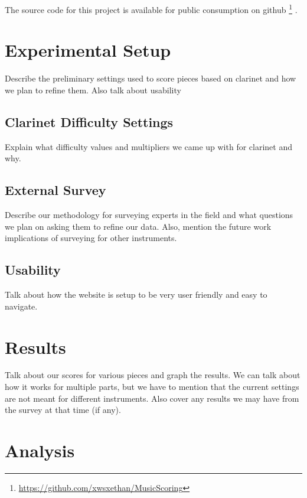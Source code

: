 \documentclass[10pt]{sigplanconf}
\begin{document}
{The source code for this project is available for public consumption on github \footnote{\url{https://github.com/xwsxethan/MusicScoring}} \cite{GithubMusicScoring}.

\section{Experimental Setup} 
\label{sec:experiment}

Describe the preliminary settings used to score pieces based on clarinet and how we plan to refine them. Also talk about usability

\subsection{Clarinet Difficulty Settings} 
\label{sec:settings}

Explain what difficulty values and multipliers we came up with for clarinet and why.

\subsection{External Survey} 
\label{sec:survey}

Describe our methodology for surveying experts in the field and what questions we plan on asking them to refine our data. Also, mention the future work implications of surveying for other instruments.

\subsection{Usability} 
\label{sec:usability}

Talk about how the website is setup to be very user friendly and easy to navigate.

\section{Results} 
\label{sec:results}

Talk about our scores for various pieces and graph the results. We can talk about how it works for multiple parts, but we have to mention that the current settings are not meant for different instruments. Also cover any results we may have from the survey at that time (if any).

\section{Analysis} 
\label{sec:analysis}

}
\end{document}
